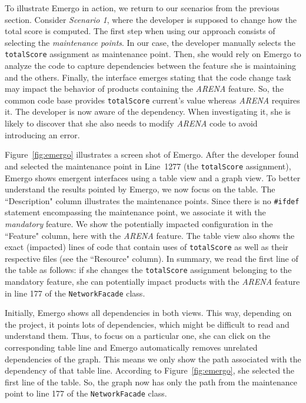 
To illustrate Emergo in action, we return to our scenarios from the previous section. Consider \textit{Scenario 1}, where the developer is supposed to change how the total score is computed. The first step when using our approach consists of selecting the \emph{maintenance points}. In our case, the developer manually selects the \texttt{totalScore} assignment as maintenance point. Then, she would rely on Emergo to analyze the code to capture dependencies between the feature she is maintaining and the others. Finally, the interface emerges stating that the code change task may impact the behavior of products containing the \textit{ARENA} feature. So, the common code base provides \texttt{totalScore} current's value whereas \textit{ARENA} requires it. The developer is now aware of the dependency. When investigating it, she is likely to discover that she also needs to modify \textit{ARENA} code to avoid introducing an error.

Figure~\ref{fig:emergo} illustrates a screen shot of Emergo. After the developer found and selected the maintenance point in Line~1277 (the \texttt{totalScore} assignment), Emergo shows emergent interfaces using a table view and a graph view. To better understand the results pointed by Emergo, we now focus on the table. The ``Description" column illustrates the maintenance points. Since there is no \texttt{\#ifdef} statement encompassing the maintenance point, we associate it with the \textit{mandatory} feature. We show the potentially impacted configuration in the ``Feature" column, here with the \textit{ARENA} feature. The table view also shows the exact (impacted) lines of code that contain uses of \texttt{totalScore} as well as their respective files (see the ``Resource" column). In summary, we read the first line of the table as follows: if she changes the \texttt{totalScore} assignment belonging to the mandatory feature, she can potentially impact products with the \textit{ARENA} feature in line 177 of the \texttt{NetworkFacade} class.

Initially, Emergo shows all dependencies in both views. This way, depending on the project, it points lots of dependencies, which might be difficult to read and understand them. Thus, to focus on a particular one, she can click on the corresponding table line and Emergo automatically removes unrelated dependencies of the graph. This means we only show the path associated with the dependency of that table line. According to Figure~\ref{fig:emergo}, she selected the first line of the table. So, the graph now has only the path from the maintenance point to line 177 of the \texttt{NetworkFacade} class. 


